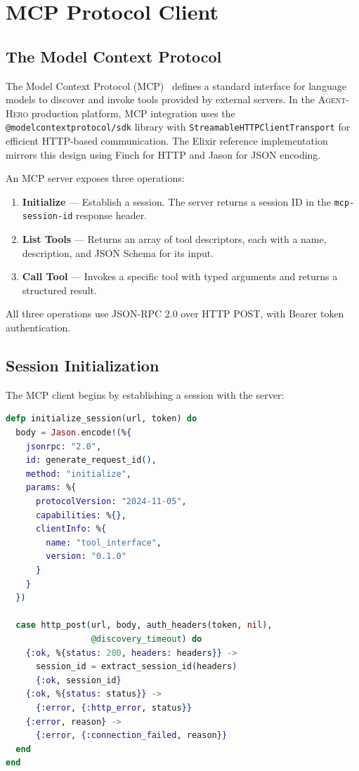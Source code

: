 \documentclass[12pt,a4paper]{article}
\theoremstyle{plain}
\theoremstyle{definition}
\newcommand{\agenthero}{\textsc{Agent-Hero}}
\begin{document}
\section{MCP Protocol Client}
\label{sec:mcp}

\subsection{The Model Context Protocol}

The Model Context Protocol (MCP)~\citep{mcp2024spec} defines a standard interface for language models to discover and invoke tools provided by external servers. In the \agenthero{} production platform, MCP integration uses the \texttt{@modelcontextprotocol/sdk} library with \texttt{StreamableHTTPClientTransport} for efficient HTTP-based communication. The Elixir reference implementation mirrors this design using Finch for HTTP and Jason for JSON encoding.

An MCP server exposes three operations:

\begin{enumerate}[leftmargin=2em]
\item \textbf{Initialize} --- Establish a session. The server returns a session ID in the \texttt{mcp-session-id} response header.
\item \textbf{List Tools} --- Returns an array of tool descriptors, each with a name, description, and JSON Schema for its input.
\item \textbf{Call Tool} --- Invokes a specific tool with typed arguments and returns a structured result.
\end{enumerate}

All three operations use JSON-RPC 2.0 over HTTP POST, with Bearer token authentication.

\subsection{Session Initialization}

The MCP client begins by establishing a session with the server:

\begin{lstlisting}[language=elixir, caption={MCP session initialization via JSON-RPC.}, label={lst:mcp-init}]
defp initialize_session(url, token) do
  body = Jason.encode!(%{
    jsonrpc: "2.0",
    id: generate_request_id(),
    method: "initialize",
    params: %{
      protocolVersion: "2024-11-05",
      capabilities: %{},
      clientInfo: %{
        name: "tool_interface",
        version: "0.1.0"
      }
    }
  })

  case http_post(url, body, auth_headers(token, nil),
                 @discovery_timeout) do
    {:ok, %{status: 200, headers: headers}} ->
      session_id = extract_session_id(headers)
      {:ok, session_id}
    {:ok, %{status: status}} ->
      {:error, {:http_error, status}}
    {:error, reason} ->
      {:error, {:connection_failed, reason}}
  end
end
\end{lstlisting}
\end{document}
